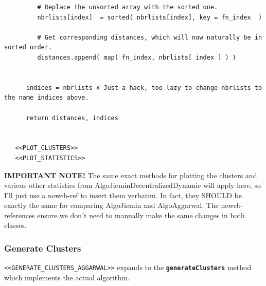 \documentclass[11pt]{article}
\begin{document}
\begin{verbatim}
         # Replace the unsorted array with the sorted one. 
         nbrlists[index]  = sorted( nbrlists[index], key = fn_index  ) 

         # Get corresponding distances, which will now naturally be in sorted order. 
         distances.append( map( fn_index, nbrlists[ index ] ) ) 


      indices = nbrlists # Just a hack, too lazy to change nbrlists to the name indices above. 

      return distances, indices 


   <<PLOT_CLUSTERS>>
   <<PLOT_STATISTICS>>
\end{verbatim}

\textbf{IMPORTANT NOTE!}
The same exact methods for plotting the clusters and various other statistics from AlgoJieminDecentralizedDynamic
will apply here, so I'll just use a noweb-ref to insert them verbatim. In fact, they SHOULD be exactly the same 
for comparing AlgoJiemin and AlgoAggarwal. The noweb-references ensure we don't need to manually make the 
same changes in both classes. 


\subsubsection{Generate Clusters}
\label{sec-3-3-1}
\verb~<<GENERATE_CLUSTERS_AGGARWAL>>~ expands to the \textbf{\verb~generateClusters~} method which implements the actual algorithm.  
\end{document}
